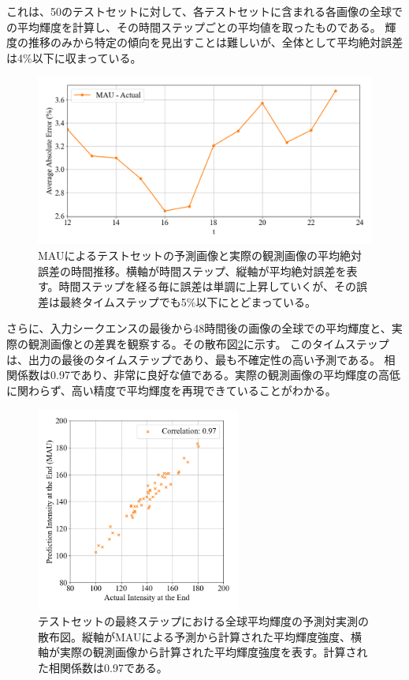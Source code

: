           これは、50のテストセットに対して、各テストセットに含まれる各画像の全球での平均輝度を計算し、その時間ステップごとの平均値を取ったものである。
          輝度の推移のみから特定の傾向を見出すことは難しいが、全体として平均絶対誤差は4\%以下に収まっている。
          \begin{figure}[htbp]
            \centering
            \includegraphics[width=\textwidth]{figures/exp1/error.png}
            \caption{MAUによるテストセットの予測画像と実際の観測画像の平均絶対誤差の時間推移。横軸が時間ステップ、縦軸が平均絶対誤差を表す。時間ステップを経る毎に誤差は単調に上昇していくが、その誤差は最終タイムステップでも5\%以下にとどまっている。}
            \label{fig:exp1_mean_intensity_line}
          \end{figure}
          さらに、入力シークエンスの最後から48時間後の画像の全球での平均輝度と、実際の観測画像との差異を観察する。その散布図\ref{fig:exp1_mean_intensity_scatter}に示す。
          このタイムステップは、出力の最後のタイムステップであり、最も不確定性の高い予測である。
          相関係数は0.97であり、非常に良好な値である。実際の観測画像の平均輝度の高低に関わらず、高い精度で平均輝度を再現できていることがわかる。
          \begin{figure}[htbp]
            \centering
            \includegraphics[width=0.6\textwidth]{figures/exp1/intensity_scatter_gt_pd.png}
            \caption{テストセットの最終ステップにおける全球平均輝度の予測対実測の散布図。縦軸がMAUによる予測から計算された平均輝度強度、横軸が実際の観測画像から計算された平均輝度強度を表す。計算された相関係数は0.97である。}
            \label{fig:exp1_mean_intensity_scatter}
          \end{figure}

